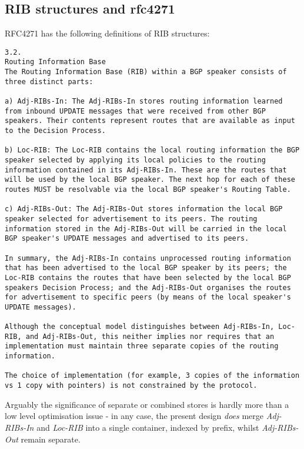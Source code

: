 \subsection{RIB structures and rfc4271}\label{rib section}

RFC4271 has the following definitions of RIB structures:
\lstset{frame = tb, numbers = none }

\begin{lstlisting}
3.2.
Routing Information Base
The Routing Information Base (RIB) within a BGP speaker consists of three distinct parts:

a) Adj-RIBs-In: The Adj-RIBs-In stores routing information learned from inbound UPDATE messages that were received from other BGP speakers. Their contents represent routes that are available as input to the Decision Process.

b) Loc-RIB: The Loc-RIB contains the local routing information the BGP speaker selected by applying its local policies to the routing information contained in its Adj-RIBs-In. These are the routes that will be used by the local BGP speaker. The next hop for each of these routes MUST be resolvable via the local BGP speaker's Routing Table.

c) Adj-RIBs-Out: The Adj-RIBs-Out stores information the local BGP speaker selected for advertisement to its peers. The routing information stored in the Adj-RIBs-Out will be carried in the local BGP speaker's UPDATE messages and advertised to its peers.

In summary, the Adj-RIBs-In contains unprocessed routing information that has been advertised to the local BGP speaker by its peers; the Loc-RIB contains the routes that have been selected by the local BGP speakers Decision Process; and the Adj-RIBs-Out organises the routes for advertisement to specific peers (by means of the local speaker's UPDATE messages).

Although the conceptual model distinguishes between Adj-RIBs-In, Loc-RIB, and Adj-RIBs-Out, this neither implies nor requires that an implementation must maintain three separate copies of the routing information.

The choice of implementation (for example, 3 copies of the information vs 1 copy with pointers) is not constrained by the protocol.
\end{lstlisting}


Arguably the significance of separate or combined stores is hardly more than a low level optimisation issue - in any case, the present design \textit{does} merge \textit{Adj-RIBs-In} and \textit{Loc-RIB} into a single container, indexed by prefix, whilst  \textit{Adj-RIBs-Out} remain separate.

